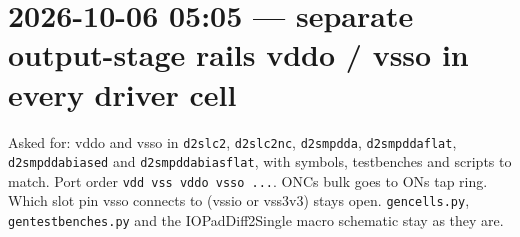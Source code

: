 \documentclass[11pt,a4paper]{article}
\renewcommand{\_}{\textunderscore\hspace{0pt}}
\begin{document}
\hypertarget{2026-10-06-0505--separate-output-stage-rails-vddo--vsso-in-every-driver-cell}{%
\section{2026-10-06 05:05 --- separate
output-stage rails vddo / vsso in every driver
cell}\label{2026-10-06-0505--separate-output-stage-rails-vddo--vsso-in-every-driver-cell}}

Asked for: vddo and vsso in \texttt{d2s\_lc2},
\texttt{d2s\_lc2\_nc}, \texttt{d2s\_mpdda},
\texttt{d2s\_mpdda\_flat},
\texttt{d2s\_mpdda\_biased} and
\texttt{d2s\_mpdda\_bias\_flat}, with symbols,
testbenches and scripts to match. Port order
\texttt{vdd\ vss\ vddo\ vsso\ ...}.
ONC\textquotesingle s bulk goes to
ON\textquotesingle s tap ring. Which slot pin vsso
connects to (vssio or vss\_3v3) stays open.
\texttt{gen\_cells.py},
\texttt{gen\_testbenches.py} and the
IOPadDiff2Single macro schematic stay as they are.
\end{document}

